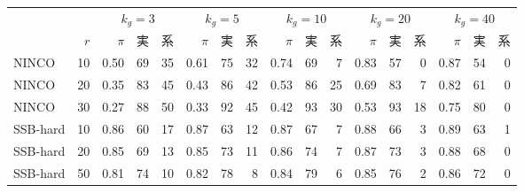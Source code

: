 {\fontsize{6.3pt}{7.4pt}\selectfont\renewcommand{\arraystretch}{1.0}%
\setlength{\tabcolsep}{1.6pt}\begin{tabular}{@{}lr|rrr|rrr|rrr|rrr|rrr@{}}
\hline
\rule[-2.0pt]{0pt}{8.2pt} & & \multicolumn{3}{c|}{$k_g{=}3$} & \multicolumn{3}{c|}{$k_g{=}5$} & \multicolumn{3}{c|}{$k_g{=}10$} & \multicolumn{3}{c|}{$k_g{=}20$} & \multicolumn{3}{c}{$k_g{=}40$} \\
\rule[-2.0pt]{0pt}{8.2pt} & $r$ & $\pi$ & 実 & 系 & $\pi$ & 実 & 系 & $\pi$ & 実 & 系 & $\pi$ & 実 & 系 & $\pi$ & 実 & 系 \\
\hline
NINCO & 10 & 0.50 & 69 & 35 & 0.61 & 75 & 32 & 0.74 & 69 & 7 & 0.83 & 57 & 0 & 0.87 & 54 & 0 \\
NINCO & 20 & 0.35 & 83 & 45 & 0.43 & 86 & 42 & 0.53 & 86 & 25 & 0.69 & 83 & 7 & 0.82 & 61 & 0 \\
NINCO & 30 & 0.27 & 88 & 50 & 0.33 & 92 & 45 & 0.42 & 93 & 30 & 0.53 & 93 & 18 & 0.75 & 80 & 0 \\
SSB-hard & 10 & 0.86 & 60 & 17 & 0.87 & 63 & 12 & 0.87 & 67 & 7 & 0.88 & 66 & 3 & 0.89 & 63 & 1 \\
SSB-hard & 20 & 0.85 & 69 & 13 & 0.85 & 73 & 11 & 0.86 & 74 & 7 & 0.87 & 73 & 3 & 0.88 & 68 & 0 \\
SSB-hard & 50 & 0.81 & 74 & 10 & 0.82 & 78 & 8 & 0.84 & 79 & 6 & 0.85 & 76 & 2 & 0.86 & 72 & 0 \\
\hline
\end{tabular}}%
